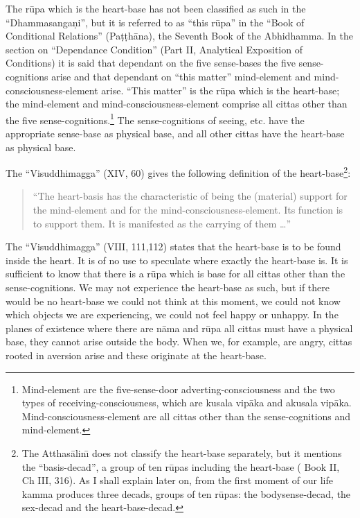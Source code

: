 \documentclass{book}
\begin{document}
The r\=upa which is the heart-base has not been classified as such in
the ``Dhamma\-sanga\d ni'', but it is referred to as ``this r\=upa'' in
the ``Book of Conditional Relations'' (Pa\d t\d th{\=a}na), the Seventh
Book of the Abhidhamma. In the section on ``Dependance Condition''
(Part II, Analytical Exposition of Conditions) it is said that
dependant on the five sense-bases the five sense-cognitions arise
and that dependant on ``this matter'' mind-element and
mind-consciousness-element arise. ``This matter'' is the r\=upa
which is the heart-base; the mind-element and
mind-consciousness-element comprise all cittas other than the five
sense-cognitions.\footnote{Mind-element are the
five-sense-door adverting-consciousness and the two types of
receiving-consciousness, which are kusala vip{\=a}ka and akusala
vip{\=a}ka. Mind-consciousness-element are all cittas other than
the sense-cognitions and mind-element.} The sense-cognitions of
seeing, etc. have the appropriate sense-base as physical base, and
all other cittas have the heart-base as physical base. 

The ``Visuddhimagga'' (XIV, 60) gives the following definition of the
heart-base\footnote{The Atthas{\=a}lin\=\i{}  does
not classify the heart-base separately, but it mentions the
``basis-decad'', a group of ten r\=upas including the heart-base (
Book II, Ch III, 316). As I shall explain later on, from the first
moment of our life kamma produces three decads, groups of ten r\=upas:
the bodysense-decad, the sex-decad and the heart-base-decad.}:





\begin{quote}\begin{flushleft}
``The heart-basis has the characteristic of being the (material)
support for the mind-element and for the
mind-consciousness-element. Its function is to support them. It is
manifested as the carrying of them \ldots''
\end{flushleft}\end{quote}




The ``Visuddhimagga'' (VIII, 111,112) states that the heart-base is to
be found inside the heart. It is of no use to speculate where exactly
the heart-base is. It is sufficient to know that there is a r\=upa
which is base for all cittas other than the sense-cognitions. We may
not experience the heart-base as such, but if there would be no
heart-base we could not think at this moment, we could not know which
objects we are experiencing, we could not feel happy or unhappy. In the
planes of existence where there are n{\=a}ma and r\=upa all cittas must
have a physical base, they cannot arise outside the body. When we, for
example, are angry, cittas rooted in aversion arise and these originate
at the heart-base.
\end{document}
